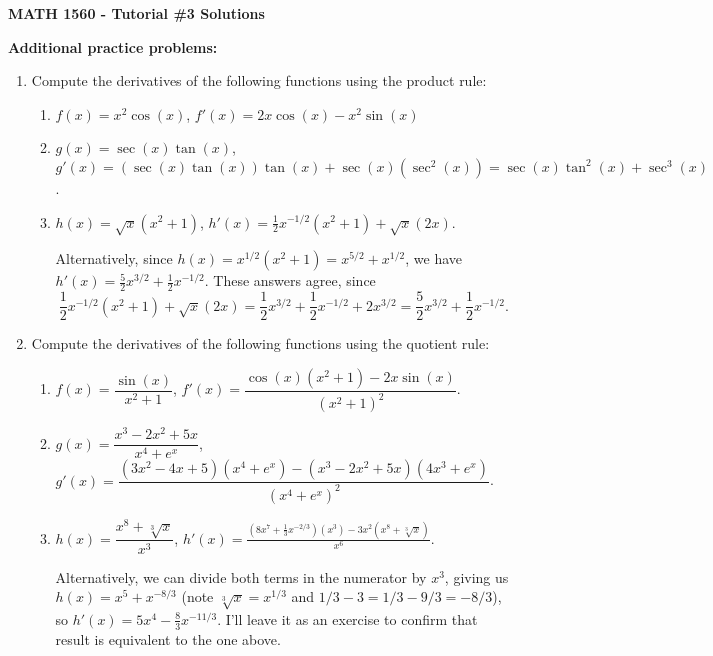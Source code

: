\documentclass[12pt]{article}
\begin{document}
\author{Instructor: Sean Fitzpatrick}
\thispagestyle{empty}
\begin{center}

{\bf MATH 1560 - Tutorial \#3 Solutions}
\end{center}

\textbf{Additional practice problems:}
\begin{enumerate}
\item Compute the derivatives of the following functions using the product rule:
\begin{enumerate}
\item $f(x) = x^2\cos(x)$, $f'(x)=2x\cos(x)-x^2\sin(x)$

\item $g(x) = \sec(x)\tan(x)$, $g'(x) = (\sec(x)\tan(x))\tan(x)+\sec(x)(\sec^2(x))=\sec(x)\tan^2(x)+\sec^3(x)$.
\item $h(x) = \sqrt{x}(x^2+1)$, $h'(x) = \frac12 x^{-1/2}(x^2+1)+\sqrt{x}(2x)$.

Alternatively, since $h(x) = x^{1/2}(x^2+1)=x^{5/2}+x^{1/2}$, we have $h'(x) = \frac52 x^{3/2}+\frac12 x^{-1/2}$. These answers agree, since 
\[
\frac12 x^{-1/2}(x^2+1)+\sqrt{x}(2x) = \frac12 x^{3/2}+\frac12 x^{-1/2}+2x^{3/2} = \frac52 x^{3/2}+\frac12 x^{-1/2}.
\]
\end{enumerate}


\item Compute the derivatives of the following functions using the quotient rule:
\begin{enumerate}
\item $f(x) = \dfrac{\sin(x)}{x^2+1}$, $f'(x) = \dfrac{\cos(x)(x^2+1)-2x\sin(x)}{(x^2+1)^2}$.
\item $g(x) = \dfrac{x^3-2x^2+5x}{x^4+e^x}$, $g'(x) = \dfrac{(3x^2-4x+5)(x^4+e^x)-(x^3-2x^2+5x)(4x^3+e^x)}{(x^4+e^x)^2}$.
\item $h(x) = \dfrac{x^8+\sqrt[3]{x}}{x^3}$, $h'(x) = \frac{(8x^7+\frac13 x^{-2/3})(x^3)-3x^2(x^8+\sqrt[3]{x})}{x^6}$.

Alternatively, we can divide both terms in the numerator by $x^3$, giving us $h(x) = x^5+x^{-8/3}$ (note $\sqrt[3]{x}=x^{1/3}$ and $1/3-3=1/3-9/3=-8/3$), so $h'(x)=5x^4-\frac83 x^{-11/3}$. I'll leave it as an exercise to confirm that result is equivalent to the one above.
\end{enumerate}

\end{enumerate}




\newpage
\end{document}
